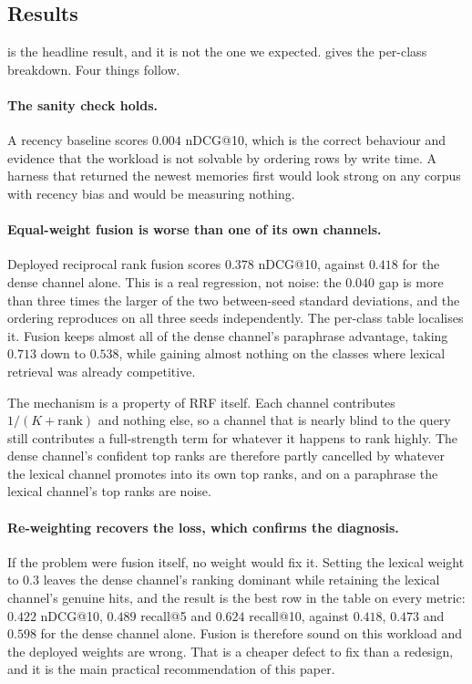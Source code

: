 \documentclass[10pt,twocolumn]{article}
\begin{document}
\subsection{Results}



 is the headline result, and it is not the one we expected.
 gives the per-class breakdown. Four things follow.

\paragraph{The sanity check holds.}
A recency baseline scores $0.004$ nDCG@10, which is the correct behaviour and
evidence that the workload is not solvable by ordering rows by write time. A
harness that returned the newest memories first would look strong on any corpus
with recency bias and would be measuring nothing.

\paragraph{Equal-weight fusion is worse than one of its own channels.}
Deployed reciprocal rank fusion scores $0.378$ nDCG@10, against $0.418$ for the
dense channel alone. This is a real regression, not noise: the $0.040$ gap is
more than three times the larger of the two between-seed standard deviations,
and the ordering reproduces on all three seeds independently. The
per-class table localises it. Fusion keeps almost all of the dense channel's
paraphrase advantage, taking $0.713$ down to $0.538$, while gaining almost
nothing on the classes where lexical retrieval was already competitive.

The mechanism is a property of RRF itself. Each channel contributes
$1/(K+\mathrm{rank})$ and nothing else, so a channel that is nearly blind to the
query still contributes a full-strength term for whatever it happens to rank
highly. The dense channel's confident top ranks are therefore partly cancelled by
whatever the lexical channel promotes into its own top ranks, and on a paraphrase
the lexical channel's top ranks are noise.

\paragraph{Re-weighting recovers the loss, which confirms the diagnosis.}
If the problem were fusion itself, no weight would fix it. Setting the lexical
weight to $0.3$ leaves the dense channel's ranking dominant while retaining the
lexical channel's genuine hits, and the result is the best row in the table on
every metric: $0.422$ nDCG@10, $0.489$ recall@5 and $0.624$ recall@10, against
$0.418$, $0.473$ and $0.598$ for the dense channel alone. Fusion is therefore
sound on this workload and the deployed weights are wrong. That is a cheaper
defect to fix than a redesign, and it is the main practical recommendation of
this paper.
\end{document}
